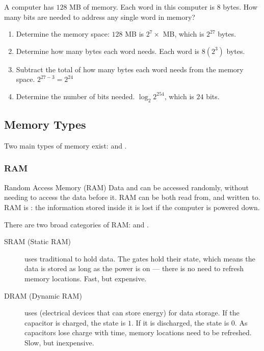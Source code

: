 \documentclass[\main/notes.tex]{subfiles}
\begin{document}
				\begin{example}
					A computer has $128$ MB of memory. Each word in this computer is $8$ bytes. How many bits are needed to address any single word in memory?
					\begin{enumerate}[nosep]
						\item Determine the memory space: $128$ MB is $2^{7} \times$ MB, which is $2^{27}$ bytes.
						\item Determine how many bytes each word needs. Each word is $8 (2^{3})$ bytes.
						\item Subtract the total of how many bytes each word needs from the memory space. $2^{27 - 3} = 2^{24}$
						\item Determine the number of bits needed. $\log_{2}2^{254}$, which is $24$ bits.
					\end{enumerate}
				\end{example}
			\subsection{Memory Types}
				Two main types of memory exist:  and .
				\subsubsection{RAM}
					\begin{definition}{Random Access Memory (RAM)}
						Data and can be accessed randomly, without needing to access the data before it. RAM can be both read from, and written to. RAM is : the information stored inside it is lost if the computer is powered down.
					\end{definition}
					There are two broad categories of RAM:  and .
					\begin{indentparagraph}
						\begin{description}
							\item[SRAM (Static RAM)] uses traditional  to hold data. The gates hold their state, which means the data is stored as long as the power is on --- there is no need to refresh memory locations. Fast, but expensive.
							\item[DRAM (Dynamic RAM)] uses  (electrical devices that can store energy) for data storage. If the capacitor is charged, the state is $1$. If it is discharged, the state is $0$. As capacitors lose charge with time, memory locations need to be refreshed. Slow, but inexpensive.
						\end{description}
					\end{indentparagraph}
\end{document}

